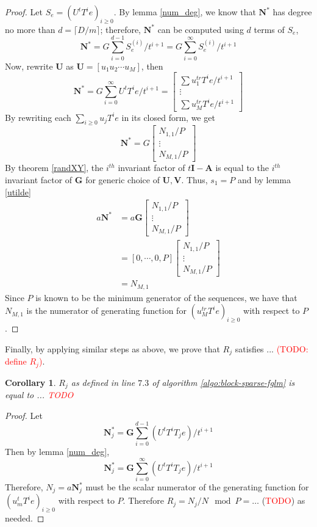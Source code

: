\documentclass[12pt]{article}
\newtheorem{corollary}[definition]{Corollary}
\def\mA{\mathbf{A}}
\def\mG{\mathbf{G}}
\def\mI{\mathbf{I}}
\def\mN{\mathbf{N}}
\def\mU{\mathbf{U}}
\def\mV{\mathbf{V}}
\begin{document}
\begin{proof}
	Let $S_e = (U^tT^ie)_{i\ge0}$.
	By lemma \ref{num_deg}, we know that $\mN^*$ has degree no more than
	$d = \lceil D/m \rceil $; therefore, $\mN^*$ can be computed using $d$
	terms of $S_e$,
	$$
	\mN^* = G \sum_{i=0}^{d-1} S_e^{(i)}/t^{i+1}
	= G \sum_{i=0}^{\infty} S_e^{(i)}/t^{i+1}
	$$
	Now, rewrite $\mU$ as $\mU = [u_1 u_2 \cdots u_M]$, then
	$$
	\mN^* = G
	\sum_{i=0}^{\infty} U^t T^i e / t^{i+1} =
	\begin{bmatrix}
	\sum u_1^{tr}T^ie/t^{i+1}\\
	\vdots                   \\
	\sum u_M^{tr}T^ie/t^{i+1}
	\end{bmatrix}$$
	By rewriting each $\sum_{i\ge0} u_j T^i e$ in its closed form, we get
	$$ \mN^* = G 
	\begin{bmatrix}
	N_{1,1} / P \\
	\vdots      \\
	N_{M,1} / P 
	\end{bmatrix}
	$$
	By theorem \ref{randXY}, the $i^{th}$ invariant factor of
	$t\mI - \mA$ is equal to the $i^{th}$ invariant factor of $\mG$ for generic choice of
	$\mU,\mV$. Thus, $s_1 = P$ and by lemma \ref{utilde}
	\begin{align*}
	a \mN^* &= a \mG
	\begin{bmatrix}
	N_{1,1} / P \\
	\vdots      \\
	N_{M,1} / P 
	\end{bmatrix} \\
	&= [0,\cdots,0,P]
	\begin{bmatrix}
	N_{1,1} / P \\
	\vdots      \\
	N_{M,1} / P 
	\end{bmatrix}\\
	&= N_{M,1}
	\end{align*}
	Since $P$ is known to be the minimum generator of 
	the sequences, we have that $N_{M,1}$ is the
	numerator of generating function for 
	$(u_{M}^{tr} T^i e)_{i \ge 0}$ with
	respect to $P$.
\end{proof}
Finally, by applying similar steps as above, we prove that
$R_j$ satisfies ... \textcolor{red}{(TODO: define $R_j$)}.
\begin{corollary}
	$R_j$ as defined in line $7.3$ of algorithm \ref{algo:block-sparse-fglm} is equal to ... \textcolor{red}{TODO}
\end{corollary}
\begin{proof}
	Let $$\mN_j^* = \mG \sum_{i=0}^{d-1} (U^tT^iT_je)/t^{i+1}$$ 
	Then
	by lemma \ref{num_deg}, 
	$$\mN_j^* = \mG \sum_{i=0}^{\infty}
	(U^tT^iT_je)/t^{i+1}$$
	Therefore, $N_j=a\mN_j^*$ must be the scalar numerator of the
	generating function for $(u^t_mT^ie)_{i\ge0}$ with respect to
	$P$. Therefore $R_j = N_j/N \mod P = \dots$ (\textcolor{red}{TODO})
	as needed.
\end{proof}
\end{document}
